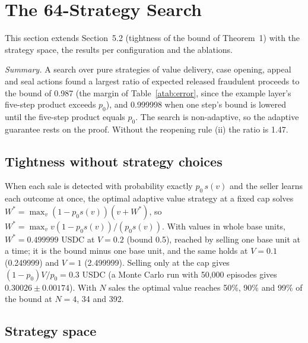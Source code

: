 \documentclass[10pt,a4paper]{article}
\theoremstyle{plain}
\theoremstyle{remark}
\begin{document}
\section{The 64-Strategy Search}
\label{sec:s4}

This section extends Section~5.2 (tightness of the bound of Theorem~1) with the strategy space, the results per configuration and the ablations.

\emph{Summary.} A search over pure strategies of value delivery, case opening, appeal and seal actions found a largest ratio of expected released fraudulent proceeds to the bound of 0.987 (the margin of Table~\ref{atab:error}, since the example layer's five-step product exceeds $p_0$), and 0.999998 when one step's bound is lowered until the five-step product equals $p_0$. The search is non-adaptive, so the adaptive guarantee rests on the proof. Without the reopening rule (ii) the ratio is 1.47.


\subsection{Tightness without strategy choices}

When each sale is detected with probability exactly $p_0\,s(v)$ and the seller learns each outcome at once, the optimal adaptive value strategy at a fixed cap solves $W^*=\max_v(1-p_0s(v))(v+W^*)$, so $W^*=\max_v v(1-p_0s(v))/(p_0s(v))$. With values in whole base units, $W^*=0.499999$ USDC at $V=0.2$ (bound 0.5), reached by selling one base unit at a time; it is the bound minus one base unit, and the same holds at $V=0.1$ (0.249999) and $V=1$ (2.499999). Selling only at the cap gives $(1-p_0)V/p_0=0.3$ USDC (a Monte Carlo run with 50,000 episodes gives $0.30026\pm0.00174$). With $N$ sales the optimal value reaches 50\%, 90\% and 99\% of the bound at $N=4$, 34 and 392.

\subsection{Strategy space}
\end{document}
